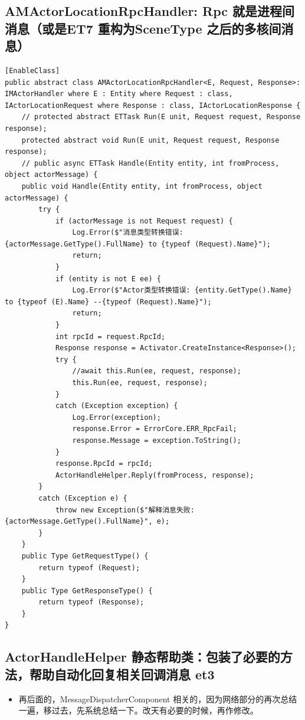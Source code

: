 \documentclass[9pt, b5paper]{article}
\begin{document}
\subsection{AMActorLocationRpcHandler: Rpc 就是进程间消息（或是ET7 重构为SceneType 之后的多核间消息）}
\label{sec-12-9}
\begin{verbatim}
[EnableClass]
public abstract class AMActorLocationRpcHandler<E, Request, Response>: IMActorHandler where E : Entity where Request : class, IActorLocationRequest where Response : class, IActorLocationResponse {
    // protected abstract ETTask Run(E unit, Request request, Response response);
    protected abstract void Run(E unit, Request request, Response response);
    // public async ETTask Handle(Entity entity, int fromProcess, object actorMessage) {
    public void Handle(Entity entity, int fromProcess, object actorMessage) {
        try {
            if (actorMessage is not Request request) {
                Log.Error($"消息类型转换错误: {actorMessage.GetType().FullName} to {typeof (Request).Name}");
                return;
            }
            if (entity is not E ee) {
                Log.Error($"Actor类型转换错误: {entity.GetType().Name} to {typeof (E).Name} --{typeof (Request).Name}");
                return;
            }
            int rpcId = request.RpcId;
            Response response = Activator.CreateInstance<Response>();
            try {
                //await this.Run(ee, request, response);
                this.Run(ee, request, response);
            }
            catch (Exception exception) {
                Log.Error(exception);
                response.Error = ErrorCore.ERR_RpcFail;
                response.Message = exception.ToString();
            }
            response.RpcId = rpcId;
            ActorHandleHelper.Reply(fromProcess, response);
        }
        catch (Exception e) {
            throw new Exception($"解释消息失败: {actorMessage.GetType().FullName}", e);
        }
    }
    public Type GetRequestType() {
        return typeof (Request);
    }
    public Type GetResponseType() {
        return typeof (Response);
    }
}
\end{verbatim}
\subsection{ActorHandleHelper 静态帮助类：包装了必要的方法，帮助自动化回复相关回调消息 et3}
\label{sec-12-10}
\begin{itemize}
\item 再后面的，MessageDispatcherComponent 相关的，因为网络部分的再次总结一遍，移过去，先系统总结一下。改天有必要的时候，再作修改。
\end{itemize}
\end{document}
